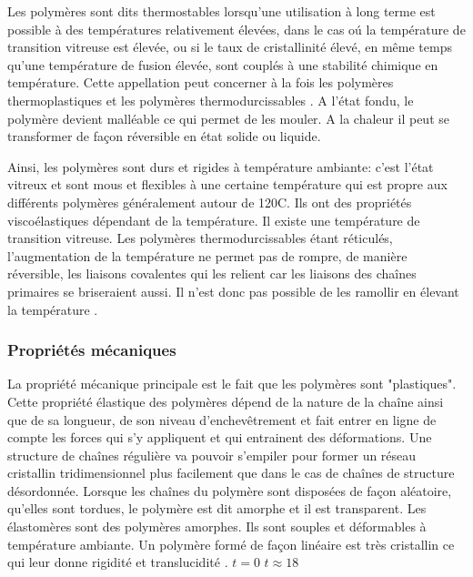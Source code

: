 \par{
Les polym\`eres sont dits thermostables lorsqu'une utilisation \`a long terme est possible \`a des temp\'eratures relativement \'elev\'ees, dans le cas o\'u la temp\'erature de transition vitreuse est \'elev\'ee, ou si le taux de cristallinit\'e \'elev\'e, en m\^eme temps qu'une temp\'erature de fusion \'elev\'ee, sont coupl\'es \`a une stabilit\'e chimique en temp\'erature. Cette appellation peut concerner \`a la fois les polym\`eres thermoplastiques et les polym\`eres thermodurcissables {\citep{domin2013}}. A l'\'etat fondu, le polym\`ere devient mall\'eable ce qui permet de les mouler. A la chaleur il peut se transformer de fa\c con r\'eversible en \'etat solide ou liquide.
}
\par{
Ainsi, les polym\`eres sont durs et rigides \`a temp\'erature ambiante: c'est l'\'etat vitreux et sont mous et flexibles \`a une certaine temp\'erature qui est propre aux diff\'erents polym\`eres g\'en\'eralement autour de 120\degree C. Ils ont des propri\'et\'es visco\'elastiques d\'ependant de la temp\'erature. Il existe une temp\'erature de transition vitreuse. Les polym\`eres thermodurcissables \'etant r\'eticul\'es, l'augmentation de la temp\'erature ne permet pas de rompre, de mani\`ere r\'eversible, les liaisons covalentes qui les relient car les liaisons des cha\^ines primaires se briseraient aussi. Il n'est donc pas possible de les ramollir en \'elevant la temp\'erature {\citep{lecomte2009physique}}.
}

\subsubsection{Propri\'et\'es m\'ecaniques}
\par{
La propri\'et\'e m\'ecanique principale est le fait que les polym\`eres sont "plastiques". Cette propri\'et\'e \'elastique des polym\`eres d\'epend de la nature de la cha\^ine ainsi que de sa longueur, de son niveau d'enchev\^etrement et fait entrer en ligne de compte les forces qui s'y appliquent et qui entrainent des d\'eformations. Une structure de cha\^ines r\'eguli\`ere va pouvoir s'empiler pour former un r\'eseau cristallin tridimensionnel plus facilement que dans le cas de cha\^ines de structure d\'esordonn\'ee. Lorsque les cha\^ines du polym\`ere sont dispos\'ees de fa\c con al\'eatoire, qu'elles sont tordues, le polym\`ere est dit amorphe et il est transparent. Les \'elastom\`eres sont des polym\`eres amorphes. Ils sont souples et d\'eformables  \`a temp\'erature ambiante. Un polym\`ere form\'e de fa\c con lin\'eaire est tr\`es cristallin ce qui leur donne rigidit\'e et translucidit\'e {\citep{lecomte2009physique}}.
}
$t=0$  $t\approx 18$
